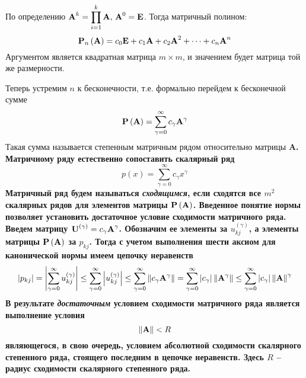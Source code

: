 \documentclass[../../calc-math-exam-2023.tex]{subfiles}
\begin{document}
    По определению $\displaystyle \bf{A}^k = \prod_{i=1}^k \bf{A}, \, \bf{A}^0 = \bf{E}$. Тогда матричный полином:
    \begin{equation*}
        \bf{P}_n \left( \bf{A} \right) = c_0 \bf{E} + c_1 \bf{A} + c_2 \bf{A}^2 + \dots + c_n \bf{A}^n
    \end{equation*}
    Аргументом является квадратная матрица $m \times m$, и значением будет матрица той же размерности.

    Теперь устремим $n$ к бесконечности, т.е. формально перейдем к бесконечной сумме
    \begin{equation}
        \bf{P}\left( \bf{A} \right) = \sum_{\gamma = 0}^{\infty} c_{\gamma} \bf{A}^{\gamma} \label{eq:matrix_row}
    \end{equation}
    Такая сумма называется степенным матричным рядом относительно матрицы \bf{A}. Матричному ряду естественно
    сопоставить скалярный ряд
    \begin{equation*}
        p(x) = \sum_{\gamma = 0}^{\infty} c_{\gamma} x^{\gamma}
    \end{equation*}
    Матричный ряд будем называться \emph{сходящимся}, если сходятся все $m^2$ скалярных рядов для элементов
    матрицы $\bf{P}\left( \bf{A} \right)$. Введенное понятие нормы позволяет установить достаточное условие
    сходимости матричного ряда. Введем матрицу $\displaystyle \bf{U}^{(\gamma)} = c_{\gamma}\bf{A}^{\gamma}$.
    Обозначим ее элементы за $\displaystyle u_{kj}^{(\gamma)}$, а элементы матрицы $\bf{P} \left( \bf{A} \right)$
    за $\displaystyle p_{kj}$. Тогда с учетом выполнения шести аксиом для канонической нормы имеем цепочку
    неравенств
    \begin{equation*}
        \displaystyle \left| p_{kj} \right| = \left| \sum_{\gamma = 0}^{\infty} u_{kj}^{(\gamma)} \right| \leq \sum_{\gamma = 0}^{\infty} \left| u_{kj}^{(\gamma)} \right|
        \leq \sum_{\gamma = 0}^{\infty} \left\| c_{\gamma} \bf{A}^{\gamma} \right\| = \sum_{\gamma = 0}^{\infty} \left| c_{\gamma} \right| \left\| \bf{A}^{\gamma} \right\|
        \leq \sum_{\gamma = 0}^{\infty} \left| c_{\gamma} \right| \left\| \bf{A} \right\|^{\gamma}
    \end{equation*}
    В результате \emph{достаточным} условием сходимости матричного ряда является выполнение условия
    \begin{equation}
        \left\| \bf{A} \right\| < R
    \end{equation}
    являющегося, в свою очередь, условием абсолютной сходимости скалярного степенного ряда, стоящего последним в цепочке
    неравенств. Здесь $R$ -- радиус сходимости скалярного степенного ряда.
\end{document}

